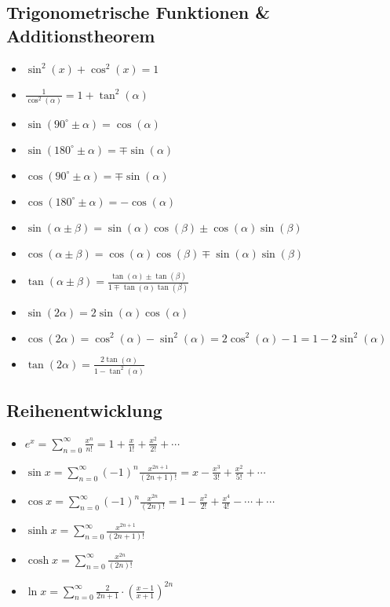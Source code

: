 \subsection{Trigonometrische Funktionen \& Additionstheorem}
\begin{itemize}[leftmargin=*]
	\item $\sin^2(x) + \cos^2(x) = 1$
	\item $\frac{1}{\cos^2(\alpha)} = 1 + \tan^2(\alpha)$
	\item $\sin(90^\circ \pm \alpha) = \cos(\alpha)$
	\item $\sin(180^\circ \pm \alpha) = \mp \sin(\alpha)$
	\item $\cos(90^\circ \pm \alpha) = \mp \sin(\alpha)$
	\item $\cos(180^\circ \pm \alpha) = - \cos(\alpha)$
	\item $\sin(\alpha \pm \beta) = \sin(\alpha)\cos(\beta) \pm
	\cos(\alpha)\sin(\beta)$
	\item $\cos(\alpha \pm \beta) = \cos(\alpha)\cos(\beta) \mp \sin(\alpha)
	\sin(\beta)$
	\item $\tan(\alpha \pm \beta) = \frac{\tan(\alpha) \pm \tan(\beta)}{1 \mp
	\tan(\alpha)\tan(\beta)}$
	\item $\sin(2\alpha) = 2 \sin(\alpha)\cos(\alpha)$
	\item $\cos(2\alpha) = \cos^2(\alpha) - \sin^2(\alpha) = 2 \cos^2(\alpha) - 1
	= 1 - 2 \sin^2(\alpha)$
	\item $\tan(2\alpha) = \frac{2 \tan(\alpha)}{1 - \tan^2(\alpha)}$
\end{itemize}

\subsection{Reihenentwicklung}
\begin{itemize}[leftmargin=*]
	\item $e^x = \sum_{n=0}^\infty \frac{x^n}{n!} = 1 + \frac{x}{1!} +
	\frac{x^2}{2!} + \cdots$
	\item $\sin x = \sum_{n=0}^\infty (-1)^n \frac{x^{2n + 1}}{(2n + 1)!} = x -
	\frac{x^3}{3!} + \frac{x^2}{5!} + \cdots$
	\item $\cos x = \sum_{n=0}^\infty (-1)^n \frac{x^{2n}}{(2n)!} = 1 -
	\frac{x^2}{2!} + \frac{x^4}{4!} - \cdots + \cdots$
	\item $\sinh x = \sum_{n=0}^\infty \frac{x^{2n+1}}{(2n + 1)!}$
	\item $\cosh x = \sum_{n=0}^\infty \frac{x^{2n}}{(2n)!}$
	\item $\ln x = \sum_{n=0}^\infty \frac{2}{2n + 1} \cdot \left(
	\frac{x-1}{x+1} \right)^{2n}$
\end{itemize}

